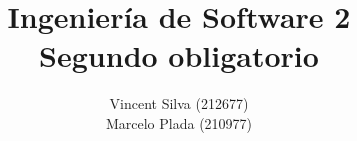 

%

\title{Ingeniería de Software 2\\Segundo obligatorio}
\author{Vincent Silva (212677) \\Marcelo Plada (210977) \\}




\maketitle


\newpage
%

\newpage


\newpage


